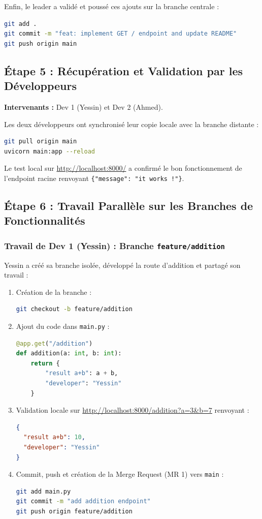 \documentclass[a4paper,12pt]{article}
\begin{document}
Enfin, le leader a validé et poussé ces ajouts sur la branche centrale :
\begin{lstlisting}[language=bash]
git add .
git commit -m "feat: implement GET / endpoint and update README"
git push origin main
\end{lstlisting}

\subsection{Étape 5 : Récupération et Validation par les Développeurs}
\textbf{Intervenants :} Dev 1 (Yessin) et Dev 2 (Ahmed).

Les deux développeurs ont synchronisé leur copie locale avec la branche distante :
\begin{lstlisting}[language=bash]
git pull origin main
uvicorn main:app --reload
\end{lstlisting}
Le test local sur \url{http://localhost:8000/} a confirmé le bon fonctionnement de l'endpoint racine renvoyant \texttt{\{"message": "it works !"\}}.

\subsection{Étape 6 : Travail Parallèle sur les Branches de Fonctionnalités}

\subsubsection{Travail de Dev 1 (Yessin) : Branche \texttt{feature/addition}}
Yessin a créé sa branche isolée, développé la route d'addition et partagé son travail :
\begin{enumerate}
    \item Création de la branche :
\begin{lstlisting}[language=bash]
git checkout -b feature/addition
\end{lstlisting}
    \item Ajout du code dans \texttt{main.py} :
\begin{lstlisting}[language=Python]
@app.get("/addition")
def addition(a: int, b: int):
    return {
        "result a+b": a + b,
        "developer": "Yessin"
    }
\end{lstlisting}
    \item Validation locale sur \url{http://localhost:8000/addition?a=3&b=7} renvoyant :
\begin{lstlisting}[language=json]
{
  "result a+b": 10,
  "developer": "Yessin"
}
\end{lstlisting}
    \item Commit, push et création de la Merge Request (MR 1) vers \texttt{main} :
\begin{lstlisting}[language=bash]
git add main.py
git commit -m "add addition endpoint"
git push origin feature/addition
\end{lstlisting}
\end{enumerate}
\end{document}
